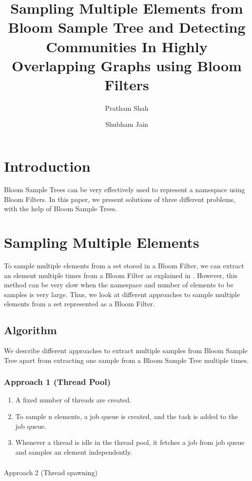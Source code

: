\documentclass[a4paper]{article}
\title{Sampling Multiple Elements from Bloom Sample Tree and Detecting Communities In Highly Overlapping Graphs using Bloom Filters}
\author{Pratham Shah \and Shubham Jain}
\begin{document}
\maketitle

\section{Introduction}
Bloom Sample Trees \cite{sengupta:2017} can be very effectively used to represent a namespace using Bloom Filters. In this paper, we present solutions of three different problems, with the help of Bloom Sample Trees. 


\section{Sampling Multiple Elements}
To sample multiple elements from a set stored in a Bloom Filter, we can extract an element multiple times from a Bloom Filter as explained in \cite{1}. However, this method can be very slow when the namespace and number of elements to be samples is very large. Thus, we look at different approaches to sample multiple elements from a set represented as a Bloom Filter.
\subsection{Algorithm}
We describe different approaches to extract multiple samples from Bloom Sample Tree apart from extracting one sample from a Bloom Sample Tree multiple times.
\subsubsection{Approach 1 (Thread Pool)}
\begin{enumerate}
  \item A fixed number of threads are created.
  \item To sample n elements, a job queue is created, and the task is added to the job queue.
  \item Whenever a thread is idle in the thread pool, it fetches a job from job queue and samples an element independently.
\end{enumerate}


\subsubsection{}{Approach 2 (Thread spawning)}
\end{document}
